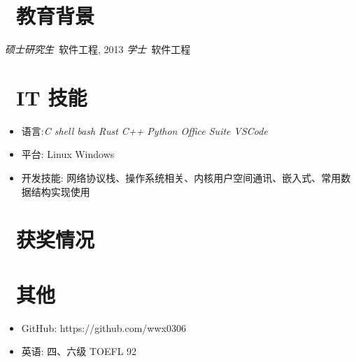 \documentclass{resume}
\begin{document}
\section{\faGraduationCap\  教育背景}
\textit{硕士研究生}\ 软件工程, 2013
\textit{学士}\ 软件工程


\section{\faCogs\ IT 技能}
\begin{itemize}[parsep=0.5ex]
	\item 语言:\textit{C shell bash Rust C++ Python Office Suite VSCode} 
  \item 平台: Linux  Windows	  
  \item 开发技能: 网络协议栈、操作系统相关、内核用户空间通讯、嵌入式、常用数据结构实现使用
\end{itemize}

\section{\faHeartO\ 获奖情况}

\section{\faInfo\ 其他}
\begin{itemize}[parsep=0.5ex]
  \item GitHub: https://github.com/wwx0306
  \item 英语: 四、六级 TOEFL 92
\end{itemize}
%
%
\end{document}
